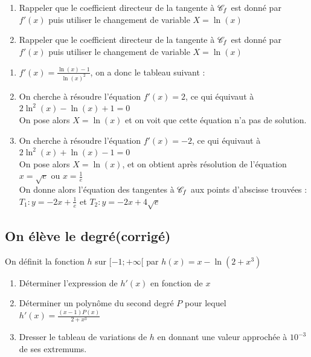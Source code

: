 \documentclass[oneside,12pt]{book}          %
\begin{document}
\begin{hint}
	\begin{enumerate}
		\item[3.] Rappeler que le coefficient directeur de la tangente à ${\mathscr{C}}_f$ est donné par $f'(x)$ puis utiliser le changement de variable $X=\ln(x)$
		\item[4.] Rappeler que le coefficient directeur de la tangente à ${\mathscr{C}}_f$ est donné par $f'(x)$ puis utiliser le changement de variable $X=\ln(x)$
	\end{enumerate}
\end{hint}
\begin{sol}
	\begin{enumerate}
		\item[2.] $f'(x)=\frac{\ln(x)-1}{\ln(x)^2}$, on a donc le tableau suivant :\\
		\item[3.] On cherche à résoudre l'équation $f'(x)=2$, ce qui équivaut à $2\ln^2(x)-\ln(x)+1=0$\\
		On pose alors $X=\ln(x)$ et on voit que cette équation n'a pas de solution.
		\item[4.] On cherche à résoudre l'équation $f'(x)=-2$, ce qui équivaut à $2\ln^2(x)+\ln(x)-1=0$\\
		On pose alors $X=\ln(x)$, et on obtient après résolution de l'équation $x=\sqrt{e}$ ou $x=\frac{1}{e}$\\
		On donne alors l'équation des tangentes à ${\mathscr{C}}_f$ aux points d'abscisse trouvées : $T_1:y=-2x+\frac{1}{e}$ et $T_2:y=-2x+4\sqrt{e}$
	\end{enumerate}
\end{sol}



\subsection{On élève le degré\quad\small{(corrigé)}}
On définit la fonction $h$ sur $[-1;+\infty[$ par $h(x)=x-\ln\left(2+x^3\right)$
\begin{enumerate}
	\item Déterminer l'expression de $h'(x)$ en fonction de $x$
	\item Déterminer un polynôme du second degré $P$ pour lequel $h'(x)=\frac{(x-1)P(x)}{2+x^3}$
	\item Dresser le tableau de variations de $h$ en donnant une valeur approchée à $10^{-3}$ de ses extremums.
\end{enumerate}
\end{document}
